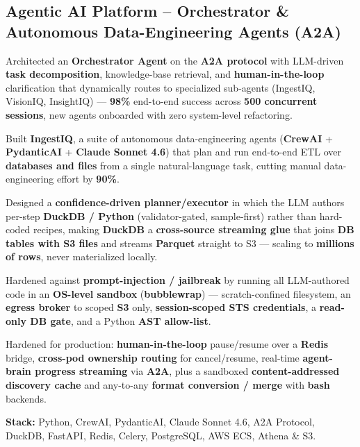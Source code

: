 \documentclass[letter,10pt]{article}
\begin{document}
\subsection{Agentic AI Platform -- Orchestrator \& Autonomous Data-Engineering Agents (A2A)}
\begin{zitemize}
\item Architected an \textbf{Orchestrator Agent} on the \textbf{A2A protocol} with LLM-driven \textbf{task decomposition}, knowledge-base retrieval, and \textbf{human-in-the-loop} clarification that dynamically routes to specialized sub-agents (IngestIQ, VisionIQ, InsightIQ) --- \textbf{98\%} end-to-end success across \textbf{500 concurrent sessions}, new agents onboarded with zero system-level refactoring.
\item Built \textbf{IngestIQ}, a suite of autonomous data-engineering agents (\textbf{CrewAI} + \textbf{PydanticAI} + \textbf{Claude Sonnet 4.6}) that plan and run end-to-end ETL over \textbf{databases and files} from a single natural-language task, cutting manual data-engineering effort by \textbf{90\%}.
\item Designed a \textbf{confidence-driven planner/executor} in which the LLM authors per-step \textbf{DuckDB / Python} (validator-gated, sample-first) rather than hard-coded recipes, making \textbf{DuckDB} a \textbf{cross-source streaming glue} that joins \textbf{DB tables with S3 files} and streams \textbf{Parquet} straight to S3 --- scaling to \textbf{millions of rows}, never materialized locally.
\item Hardened against \textbf{prompt-injection / jailbreak} by running all LLM-authored code in an \textbf{OS-level sandbox} (\textbf{bubblewrap}) --- scratch-confined filesystem, an \textbf{egress broker} to scoped \textbf{S3} only, \textbf{session-scoped STS credentials}, a \textbf{read-only DB gate}, and a Python \textbf{AST allow-list}.
\item Hardened for production: \textbf{human-in-the-loop} pause/resume over a \textbf{Redis} bridge, \textbf{cross-pod ownership routing} for cancel/resume, real-time \textbf{agent-brain progress streaming} via \textbf{A2A}, plus a sandboxed \textbf{content-addressed discovery cache} and any-to-any \textbf{format conversion / merge} with \textbf{bash} backends.
\item \textbf{Stack:} Python, CrewAI, PydanticAI, Claude Sonnet 4.6, A2A Protocol, DuckDB, FastAPI, Redis, Celery, PostgreSQL, AWS ECS, Athena \& S3.
\end{zitemize}
\end{document}
